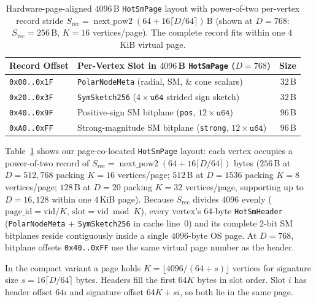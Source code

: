 \begin{table}[t]
  \centering
  \caption{Hardware-page-aligned $4096$\,B \texttt{HotSmPage} layout with power-of-two per-vertex record stride $S_{\mathrm{rec}} = \operatorname{next\_pow2}(64 + 16\lceil D/64\rceil)$\,B (shown at $D=768$: $S_{\mathrm{rec}} = 256$\,B, $K = 16$ vertices/page). The complete record fits within one $4$\,KiB virtual page.}
  \label{tab:hot_sm_page}
  \small
  \setlength{\tabcolsep}{5pt}
  \begin{tabularx}{\linewidth}{@{}l>{\raggedright\arraybackslash}Xr@{}}
    \toprule
    \textbf{Record Offset} & \textbf{Per-Vertex Slot in $4096$\,B \texttt{HotSmPage} ($D=768$)} & \textbf{Size} \\
    \midrule
    \texttt{0x00..0x1F} & \texttt{PolarNodeMeta} (radial, {SM}, \& cone scalars) & $32$\,B \\
    \texttt{0x20..0x3F} & \texttt{SymSketch256} ($4 \times \texttt{u64}$ strided sign sketch) & $32$\,B \\
    \texttt{0x40..0x9F} & Positive-sign {SM} bitplane (\texttt{pos}, $12 \times \texttt{u64}$) & $96$\,B \\
    \texttt{0xA0..0xFF} & Strong-magnitude {SM} bitplane (\texttt{strong}, $12 \times \texttt{u64}$) & $96$\,B \\
    \bottomrule
  \end{tabularx}
\end{table}

Table~\ref{tab:hot_sm_page} shows our page-co-located \texttt{HotSmPage} layout:
each vertex occupies a power-of-two record of $S_{\mathrm{rec}} = \operatorname{next\_pow2}(64 + 16\lceil D/64\rceil)$ bytes ($256$\,B at $D=512, 768$ packing $K = 16$ vertices/page; $512$\,B at $D=1536$ packing $K = 8$ vertices/page; $128$\,B at $D=20$ packing $K = 32$ vertices/page, supporting up to $D = 16{,}128$ within one $4$\,KiB page).
Because $S_{\mathrm{rec}}$ divides $4096$ evenly ($\text{page\_id} = \text{vid} / K$, $\text{slot} = \text{vid} \bmod K$), every vertex's 64-byte \texttt{HotSmHeader} (\texttt{PolarNodeMeta} + \texttt{SymSketch256} in cache line~0) and its complete 2-bit {SM} bitplanes reside contiguously inside a single $4096$-byte OS page.
At $D=768$, bitplane offsets \texttt{0x40..0xFF} use the same virtual page number as the header.


In the compact variant a page holds $K=\lfloor4096/(64+s)\rfloor$ vertices for signature size $s=16\lceil D/64\rceil$ bytes. Headers fill the first $64K$ bytes in slot order. Slot $i$ has header offset $64i$ and signature offset $64K+si$, so both lie in the same page.

